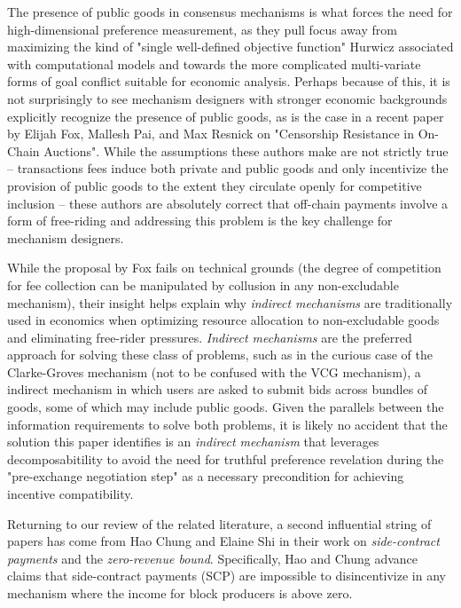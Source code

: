 The presence of public goods in consensus mechanisms is what forces the need for high-dimensional preference measurement, as they pull focus away from maximizing the kind of "single well-defined objective function" Hurwicz associated with computational models and towards the more complicated multi-variate forms of goal conflict suitable for economic analysis. Perhaps because of this, it is not surprisingly to see mechanism designers with stronger economic backgrounds explicitly recognize the presence of public goods, as is the case in a recent paper by Elijah Fox, Mallesh Pai, and Max Resnick on "Censorship Resistance in On-Chain Auctions". While the assumptions these authors make are not strictly true -- transactions fees induce both private and public goods and only incentivize the provision of public goods to the extent they circulate openly for competitive inclusion -- these authors are absolutely correct that off-chain payments involve a form of free-riding and addressing this problem is the key challenge for mechanism designers.

While the proposal by Fox fails on technical grounds (the degree of competition for fee collection can be manipulated by collusion in any non-excludable mechanism), their insight helps explain why \textit{indirect mechanisms} are traditionally used in economics when optimizing resource allocation to non-excludable goods and eliminating free-rider pressures. \textit{Indirect mechanisms} are the preferred approach for solving these class of problems, such as in the curious case of the Clarke-Groves mechanism (not to be confused with the VCG mechanism), a indirect mechanism in which users are asked to submit bids across bundles of goods, some of which may include public goods. Given the parallels between the information requirements to solve both problems, it is likely no accident that the solution this paper identifies is an \textit{indirect mechanism} that leverages decomposabitility to avoid the need for truthful preference revelation during the "pre-exchange negotiation step" as a necessary precondition for achieving incentive compatibility.

Returning to our review of the related literature, a second influential string of papers has come from Hao Chung and Elaine Shi in their work on \textit{side-contract payments} and the \textit{zero-revenue bound}. Specifically, Hao and Chung advance claims that side-contract payments (SCP) are impossible to disincentivize in any mechanism where the income for block producers is above zero.


